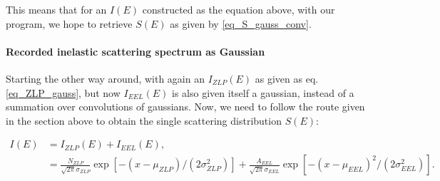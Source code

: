 
This means that for an $I(E)$ constructed as the equation above, with our program, we hope to retrieve $S(E)$ as given by \eqref{eq_S_gauss_conv}.

















\paragraph{Recorded inelastic scattering spectrum as Gaussian}
Starting the other way around, with again an $I_{ZLP}(E)$ as given as eq. \eqref{eq_ZLP_gauss}, but now $I_{EEL}(E)$ is also given itself a gaussian, instead of a summation over convolutions of gaussians. Now, we need to follow the route given in the section above to obtain the single scattering distribution $S(E)$:

\begin{equation}
\begin{aligned}
I(E) &= I_{ZLP}(E) + I_{EEL}(E),\\
&= \frac{N_{ZLP}}{\sqrt{2\pi}\sigma_{ZLP}} \exp{[-(x-\mu_{ZLP})/(2\sigma_{ZLP}^2)]} +\frac{A_{EEL}}{\sqrt{2\pi}\sigma_{EEL}} \exp{[-(x-\mu_{EEL})^2/(2\sigma_{EEL}^2)]}.
\end{aligned}
\end{equation}

